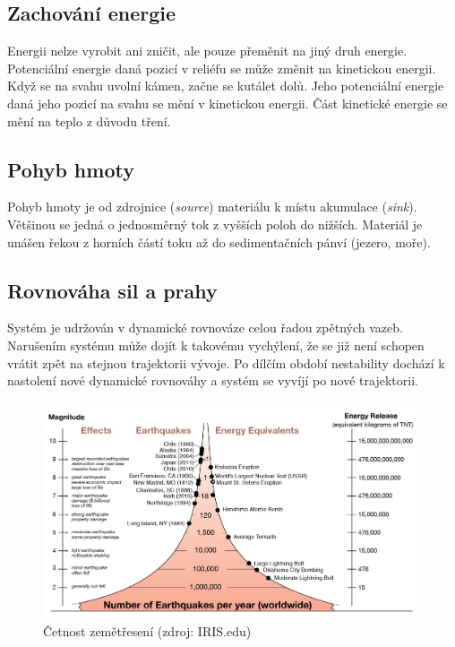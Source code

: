 \subsection{Zachování energie}
Energii nelze vyrobit ani zničit, ale pouze přeměnit na jiný druh energie. Potenciální energie daná pozicí v reliéfu se může změnit na kinetickou energii. Když se na svahu uvolní kámen, začne se kutálet dolů. Jeho potenciální energie daná jeho pozicí na svahu se mění v kinetickou energii. Část kinetické energie se mění na teplo z důvodu tření. 

\subsection{Pohyb hmoty}
Pohyb hmoty je od zdrojnice (\textit{source}) materiálu k místu akumulace (\textit{sink}). Většinou se jedná o jednosměrný tok z vyšších poloh do nižších. Materiál je unášen řekou z horních částí toku až do sedimentačních pánví (jezero, moře).

\subsection{Rovnováha sil a prahy}
Systém je udržován v dynamické rovnováze celou řadou zpětných vazeb. Narušením systému může dojít k takovému vychýlení, že se již není schopen vrátit zpět na stejnou trajektorii vývoje. Po dílčím období nestability dochází k nastolení nové dynamické rovnováhy a systém se vyvíjí po nové trajektorii.

\begin{figure}[h]
	\centering
	\includegraphics[width=1\linewidth]{obrazky/uvod/frekvence}
	\caption{Četnost zemětřesení (zdroj: IRIS.edu)}
	\label{fig:frekvence}
\end{figure}

